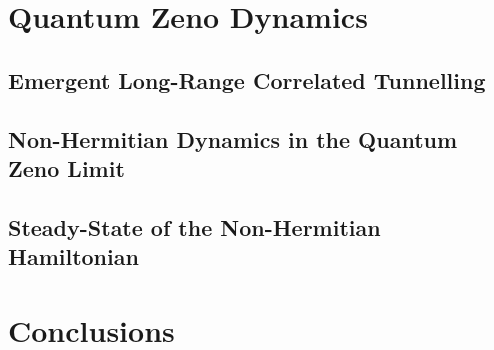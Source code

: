 \section{Quantum Zeno Dynamics}

\subsection{Emergent Long-Range Correlated Tunnelling}

\subsection{Non-Hermitian Dynamics in the Quantum Zeno Limit}


\subsection{Steady-State of the Non-Hermitian Hamiltonian}

\section{Conclusions}